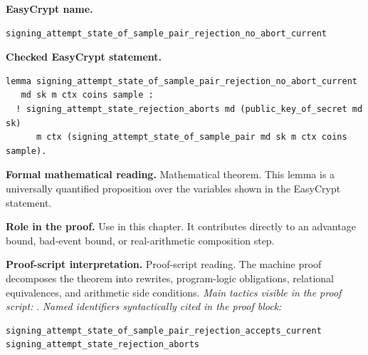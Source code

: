 \begin{formaltheorem}
\noindent\textbf{EasyCrypt name.}
\begin{lstlisting}[language=EasyCrypt,basicstyle=\ttfamily\scriptsize]
signing_attempt_state_of_sample_pair_rejection_no_abort_current
\end{lstlisting}
\noindent\textbf{Checked EasyCrypt statement.}
\begin{lstlisting}[language=EasyCrypt,basicstyle=\ttfamily\scriptsize]
lemma signing_attempt_state_of_sample_pair_rejection_no_abort_current
   md sk m ctx coins sample :
  ! signing_attempt_state_rejection_aborts md (public_key_of_secret md sk)
      m ctx (signing_attempt_state_of_sample_pair md sk m ctx coins sample).
\end{lstlisting}
\noindent\textbf{Formal mathematical reading.}
Mathematical theorem. This lemma is a universally quantified proposition over the variables shown in the EasyCrypt statement.

\noindent\textbf{Role in the proof.}
Use in this chapter. It contributes directly to an advantage bound, bad-event bound, or real-arithmetic composition step.

\noindent\textbf{Proof-script interpretation.}
Proof-script reading. The machine proof decomposes the theorem into rewrites, program-logic obligations, relational equivalences, and arithmetic side conditions.
\emph{Main tactics visible in the proof script:} .
\emph{Named identifiers syntactically cited in the proof block:}
\begin{lstlisting}[language=EasyCrypt,basicstyle=\ttfamily\scriptsize]
signing_attempt_state_of_sample_pair_rejection_accepts_current
signing_attempt_state_rejection_aborts
\end{lstlisting}

\end{formaltheorem}

